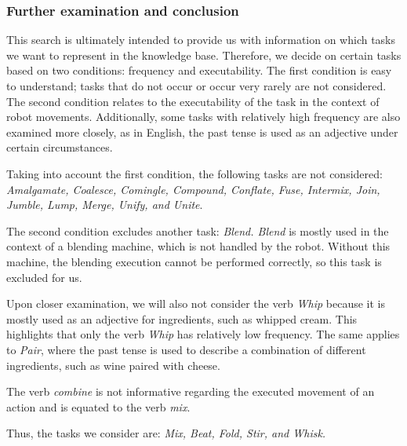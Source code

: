   \subsubsection{Further examination and conclusion}
  This search is ultimately intended to provide us with information on which tasks we want to represent in the knowledge base. Therefore, we decide on certain tasks based on two conditions: frequency and executability. The first condition is easy to understand; tasks that do not occur or occur very rarely are not considered. The second condition relates to the executability of the task in the context of robot movements. Additionally, some tasks with relatively high frequency are also examined more closely, as in English, the past tense is used as an adjective under certain circumstances.

Taking into account the first condition, the following tasks are not considered: \textit{Amalgamate, Coalesce, Comingle, Compound, Conflate, Fuse, Intermix, Join, Jumble, Lump, Merge, Unify, and Unite}.

The second condition excludes another task: \textit{Blend. Blend} is mostly used in the context of a blending machine, which is not handled by the robot. Without this machine, the blending execution cannot be performed correctly, so this task is excluded for us.

Upon closer examination, we will also not consider the verb \textit{Whip} because it is mostly used as an adjective for ingredients, such as whipped cream. This highlights that only the verb \textit{Whip} has relatively low frequency. The same applies to \textit{Pair}, where the past tense is used to describe a combination of different ingredients, such as wine paired with cheese.

The verb \textit{combine} is not informative regarding the executed movement of an action and is equated to the verb  \textit{mix}.

Thus, the tasks we consider are: \textit{Mix, Beat, Fold, Stir, and Whisk.}

